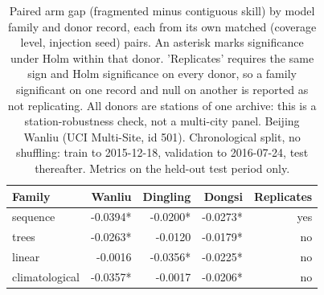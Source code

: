 \begin{table}[htbp]
\caption{Paired arm gap (fragmented minus contiguous skill) by model family and donor record, each from its own matched (coverage level, injection seed) pairs. An asterisk marks significance under Holm within that donor. 'Replicates' requires the same sign and Holm significance on every donor, so a family significant on one record and null on another is reported as not replicating. All donors are stations of one archive: this is a station-robustness check, not a multi-city panel. Beijing Wanliu (UCI Multi-Site, id 501). Chronological split, no shuffling: train to 2015-12-18, validation to 2016-07-24, test thereafter. Metrics on the held-out test period only.}
\label{tab:donor_replication}
\begin{tabular}{lrrrr}
\toprule
Family & Wanliu & Dingling & Dongsi & Replicates \\
\midrule
sequence & -0.0394* & -0.0200* & -0.0273* & yes \\
trees & -0.0263* & -0.0120 & -0.0179* & no \\
linear & -0.0016 & -0.0356* & -0.0225* & no \\
climatological & -0.0357* & -0.0017 & -0.0206* & no \\
\bottomrule
\end{tabular}
\end{table}
